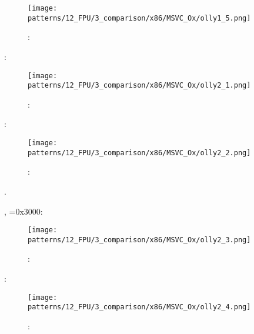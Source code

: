 \begin{figure}[H]
\centering
\texttt{[image: patterns/12\_FPU/3\_comparison/x86/MSVC\_Ox/olly1\_5.png]}
\caption{\olly: \FSTP {}}
\label{fig:FPU_comparison_Ox_case1_olly5}
\end{figure}

  

\clearpage
{}

 \FLD {}:

\begin{figure}[H]
\centering
\texttt{[image: patterns/12\_FPU/3\_comparison/x86/MSVC\_Ox/olly2\_1.png]}
\caption{\olly: }
\label{fig:FPU_comparison_Ox_case2_olly1}
\end{figure}


\clearpage
\FCOM {}:

\begin{figure}[H]
\centering
\texttt{[image: patterns/12\_FPU/3\_comparison/x86/MSVC\_Ox/olly2\_2.png]}
\caption{\olly: \FCOM {}}
\label{fig:FPU_comparison_Ox_case2_olly2}
\end{figure}

.

\clearpage
\FNSTSW {}, =0x3000:

\begin{figure}[H]
\centering
\texttt{[image: patterns/12\_FPU/3\_comparison/x86/MSVC\_Ox/olly2\_3.png]}
\caption{\olly: \FNSTSW {}}
\label{fig:FPU_comparison_Ox_case2_olly3}
\end{figure}

\clearpage
\TEST {}:

\begin{figure}[H]
\centering
\texttt{[image: patterns/12\_FPU/3\_comparison/x86/MSVC\_Ox/olly2\_4.png]}
\caption{\olly: \TEST {}}
\label{fig:FPU_comparison_Ox_case2_olly4}
\end{figure}

